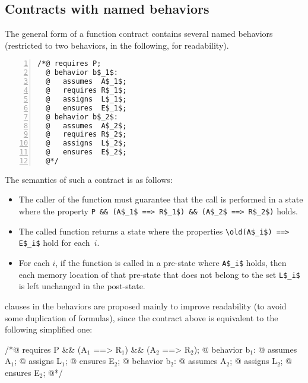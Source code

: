 \subsection{Contracts with named behaviors}
\label{subsec:behaviors}
The general form of a function contract contains several named
behaviors (restricted to two behaviors, in the following, for
readability).
\lstset{firstnumber=auto}
\begin{lstlisting}[style=c,basicstyle=\lp@basic,numbers=left,name=behaviors]
/*@ requires P;
  @ behavior b$_1$:
  @   assumes  A$_1$;
  @   requires R$_1$;
  @   assigns  L$_1$;
  @   ensures  E$_1$;
  @ behavior b$_2$:
  @   assumes  A$_2$;
  @   requires R$_2$;
  @   assigns  L$_2$;
  @   ensures  E$_2$;
  @*/
\end{lstlisting}
The semantics of such a contract is as follows:
\begin{itemize}
\item The caller of the function must guarantee that the call is
  performed in a state where the property
  \lstinline|P && (A$_1$ ==> R$_1$) && (A$_2$ ==> R$_2$)| holds.
\item The called function returns a state where
the properties \lstinline|\old(A$_i$) ==> E$_i$| hold for each~$i$.
\item For each $i$, if the function is called in a pre-state where
  \lstinline|A$_i$| holds, then each memory location of that pre-state 
  that does not belong to the set \lstinline|L$_i$| is left unchanged in 
  the post-state.
\end{itemize}

\requires{} clauses in the behaviors are proposed
mainly to improve readability (to avoid some duplication of
formulas), since the contract above is equivalent to the following
simplified one:
\begin{listing}{1}
/*@ requires P && (A$_1$ ==> R$_1$) && (A$_2$ ==> R$_2$);
  @ behavior b$_1$:
  @   assumes A$_1$;
  @   assigns L$_1$;
  @   ensures E$_2$;
  @ behavior b$_2$:
  @   assumes A$_2$;
  @   assigns L$_2$;
  @   ensures E$_2$;
  @*/
\end{listing}

